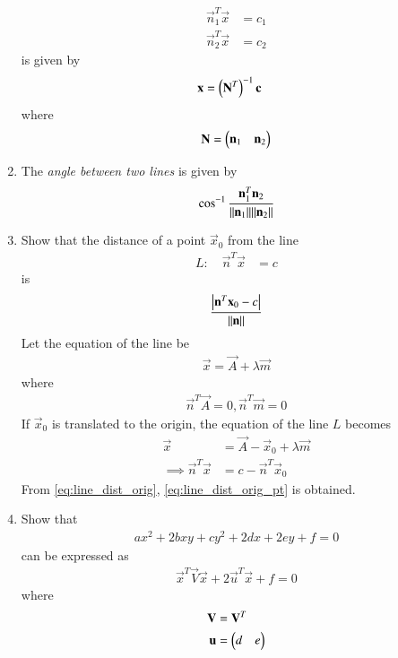 \begin{enumerate}[label=\arabic*.,ref=\thesubsection.\theenumi]
\begin{align}
\vec{n}_1^T\vec{x} &=c_1
\\
\vec{n}_2^T\vec{x} &=c_2
\end{align}
is given by 
\begin{align}
\mathbf{x} &=\left(\mathbf{N}^T\right)^{-1}\mathbf{c}
\end{align}
where 
\begin{align}
\mathbf{N} = \begin{pmatrix}\mathbf{n}_1 & \mathbf{n}_2\end{pmatrix}
\end{align}
\item The {\em angle between two lines} is given by 
\begin{align}
\cos ^{-1} \frac{\mathbf{n}_1 ^T \mathbf{n}_2}{\lVert\mathbf{n}_1\rVert  \lVert\mathbf{n}_2\rVert}
\end{align}
\item Show that the distance of a point $\vec{x}_0$ from the line 
\begin{align}
L: \quad \vec{n}^T\vec{x} &=c
\end{align}
is 
\begin{align}
\frac{\left\vert\mathbf{n}^T\mathbf{x}_0-c\right\vert}{\lVert\mathbf{n}\rVert} 
\end{align}
\solution Let the equation of the line be 
\begin{align}
\vec{x} = \vec{A} + \lambda \vec{m}
\end{align}
%
where 
\begin{align}
\label{eq:line_dist_orig_pt}
\vec{n}^T\vec{A} = 0, \vec{n}^T\vec{m} = 0
\end{align}
If $\vec{x}_0$ is translated to the origin, the equation of the line $L$ becomes 
\begin{align}
\vec{x} &= \vec{A}- \vec{x}_0+ \lambda \vec{m}
\\
\implies 
\vec{n}^T\vec{x} &=c-\vec{n}^T\vec{x}_0
\end{align}
From \eqref{eq:line_dist_orig}, \eqref{eq:line_dist_orig_pt} is obtained.
\item Show that 
\begin{align}
ax^2+2bxy+cy^2+2dx+2ey+f=0
\end{align}
can be expressed as
\begin{align}
\label{eq:quad_form}
\vec{x}^T\vec{V}\vec{x}+2\vec{u}^T\vec{x}+f=0
\end{align}
%
where
\begin{align}
\mathbf{V} &= \mathbf{V}^T
\\
\mathbf{u} &= \begin{pmatrix}d & e\end{pmatrix}
\end{align}


\end{enumerate}
